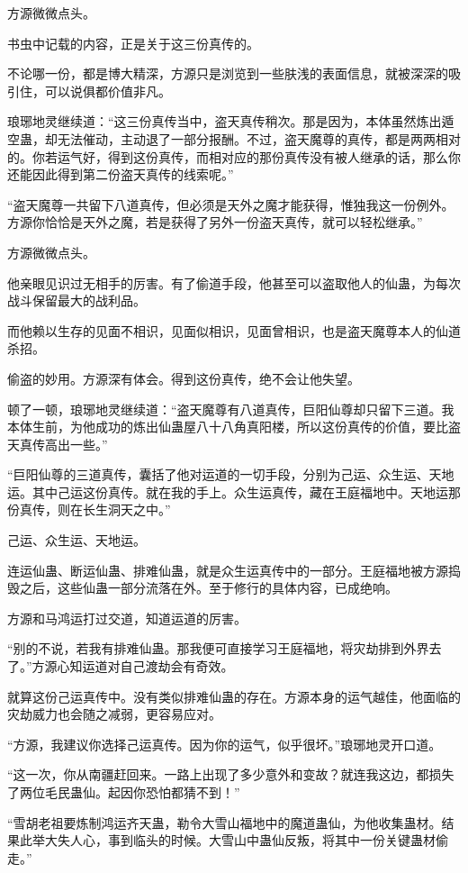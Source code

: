 \begin{this_body}
方源微微点头。

书虫中记载的内容，正是关于这三份真传的。

不论哪一份，都是博大精深，方源只是浏览到一些肤浅的表面信息，就被深深的吸引住，可以说俱都价值非凡。

琅琊地灵继续道：“这三份真传当中，盗天真传稍次。那是因为，本体虽然炼出遁空蛊，却无法催动，主动退了一部分报酬。不过，盗天魔尊的真传，都是两两相对的。你若运气好，得到这份真传，而相对应的那份真传没有被人继承的话，那么你还能因此得到第二份盗天真传的线索呢。”

“盗天魔尊一共留下八道真传，但必须是天外之魔才能获得，惟独我这一份例外。方源你恰恰是天外之魔，若是获得了另外一份盗天真传，就可以轻松继承。”

方源微微点头。

他亲眼见识过无相手的厉害。有了偷道手段，他甚至可以盗取他人的仙蛊，为每次战斗保留最大的战利品。

而他赖以生存的见面不相识，见面似相识，见面曾相识，也是盗天魔尊本人的仙道杀招。

偷盗的妙用。方源深有体会。得到这份真传，绝不会让他失望。

顿了一顿，琅琊地灵继续道：“盗天魔尊有八道真传，巨阳仙尊却只留下三道。我本体生前，为他成功的炼出仙蛊屋八十八角真阳楼，所以这份真传的价值，要比盗天真传高出一些。”

“巨阳仙尊的三道真传，囊括了他对运道的一切手段，分别为己运、众生运、天地运。其中己运这份真传。就在我的手上。众生运真传，藏在王庭福地中。天地运那份真传，则在长生洞天之中。”

己运、众生运、天地运。

连运仙蛊、断运仙蛊、排难仙蛊，就是众生运真传中的一部分。王庭福地被方源捣毁之后，这些仙蛊一部分流落在外。至于修行的具体内容，已成绝响。

方源和马鸿运打过交道，知道运道的厉害。

“别的不说，若我有排难仙蛊。那我便可直接学习王庭福地，将灾劫排到外界去了。”方源心知运道对自己渡劫会有奇效。

就算这份己运真传中。没有类似排难仙蛊的存在。方源本身的运气越佳，他面临的灾劫威力也会随之减弱，更容易应对。

“方源，我建议你选择己运真传。因为你的运气，似乎很坏。”琅琊地灵开口道。

“这一次，你从南疆赶回来。一路上出现了多少意外和变故？就连我这边，都损失了两位毛民蛊仙。起因你恐怕都猜不到！”

“雪胡老祖要炼制鸿运齐天蛊，勒令大雪山福地中的魔道蛊仙，为他收集蛊材。结果此举大失人心，事到临头的时候。大雪山中蛊仙反叛，将其中一份关键蛊材偷走。”


\end{this_body}
